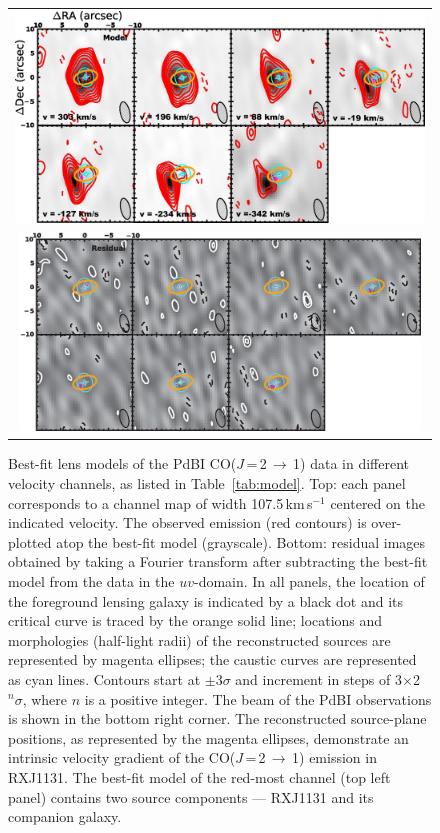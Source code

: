 \documentclass[]{emulateapj}
\newcommand{\rarr}{$\rightarrow$}
\newcommand{\bco}{\mbox{CO($J$\,=\,2\,\rarr\,1)}\xspace}
\newcommand{\kms}{\mbox{km\,s$^{-1}$}\xspace}
\newcommand{\Tab}[1]{Table~\ref{tab:#1}}
\begin{document}
\begin{figure}[tbph]
\centering
\begin{tabular}{c}
\includegraphics[trim=0 0 0 0, clip, width=1.0\textwidth]{f6a.pdf} \\
\includegraphics[width=0.98\textwidth]{f6b.pdf}
\end{tabular}
\caption{Best-fit lens models of the PdBI \bco data in different velocity channels, as listed in \Tab{model}.
Top: each panel corresponds to a channel map of width 107.5\,\kms centered on the indicated velocity.
The observed emission (red contours) is over-plotted atop the best-fit model (grayscale).
Bottom: residual images obtained by
taking a Fourier transform after subtracting the best-fit model from the
data in the $uv$-domain.
In all panels, the location of the foreground lensing galaxy is indicated by a black dot and
its critical curve is traced by the orange solid line; locations and
morphologies (half-light radii) of the reconstructed sources are
represented by magenta ellipses; the caustic curves are represented as cyan lines.
Contours start
at $\pm$3$\sigma$ and increment in steps of 3$\times$2$^n\sigma$,
where $n$ is a positive integer.
The beam of the PdBI observations is shown in the bottom right corner.
The reconstructed source-plane positions, as represented by the magenta ellipses, demonstrate an intrinsic velocity gradient of the \bco emission in RXJ1131.
The best-fit model of the red-most channel (top left panel) contains two source components --- RXJ1131 and its companion galaxy.
\label{fig:model}}
\end{figure}
\end{document}
